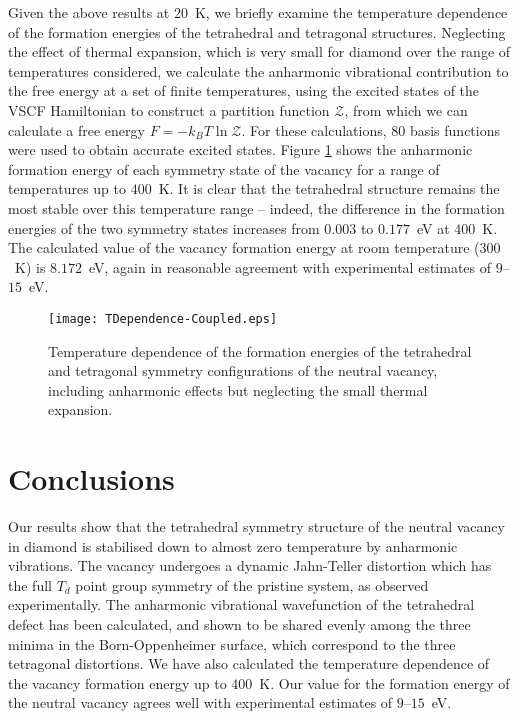 \documentclass[aps,showpacs,prb,reprint,superscriptaddress,longbibliography]{revtex4-1}
\begin{document}
Given the above results at $20$~K, we briefly examine the temperature
dependence of the formation energies of the tetrahedral and tetragonal
structures. Neglecting the effect of thermal expansion, which is very
small for diamond over the range of temperatures
considered,\cite{stoupin_thermal_2010} we calculate the anharmonic
vibrational contribution to the free energy at a set of finite
temperatures, using the excited states of the VSCF Hamiltonian to
construct a partition function $\mathcal{Z}$, from which we can
calculate a free energy
$F=-k_BT \ln \mathcal{Z}$.\cite{monserrat_anharmonic_2013} For these
calculations, 80 basis functions were used to obtain accurate excited
states. Figure \ref{fig:TDependence} shows the anharmonic formation
energy of each symmetry state of the vacancy for a range of
temperatures up to $400$~K. It is clear that the tetrahedral structure
remains the most stable over this temperature range -- indeed, the
difference in the formation energies of the two symmetry states
increases from $0.003$ to $0.177$~eV at $400$~K. The calculated value
of the vacancy formation energy at room temperature ($300$~K) is
$8.172$~eV, again in reasonable agreement with experimental estimates
of $9$--$15$~eV.\cite{bourgoin_experimental_1983}

\begin{figure}[th]
\centering
\texttt{[image: TDependence-Coupled.eps]}
\caption{Temperature dependence of the formation energies of the
  tetrahedral and tetragonal symmetry configurations of the neutral vacancy,
  including anharmonic effects but neglecting the small thermal expansion.
}
\label{fig:TDependence}
\end{figure}

\section{Conclusions} \label{sec:summary}

Our results show that the tetrahedral symmetry structure of the
neutral vacancy in diamond is stabilised down to almost zero
temperature by anharmonic vibrations.  The vacancy undergoes a dynamic
Jahn-Teller distortion which has the full $T_d$ point group symmetry
of the pristine system, as observed experimentally. The anharmonic
vibrational wavefunction of the tetrahedral defect has been
calculated, and shown to be shared evenly among the three minima in
the Born-Oppenheimer surface, which correspond to the three tetragonal
distortions. We have also calculated the temperature dependence of the
vacancy formation energy up to $400$~K. Our value for the formation
energy of the neutral vacancy agrees well with experimental estimates
of $9$--$15$~eV.\cite{bourgoin_experimental_1983}
\end{document}
